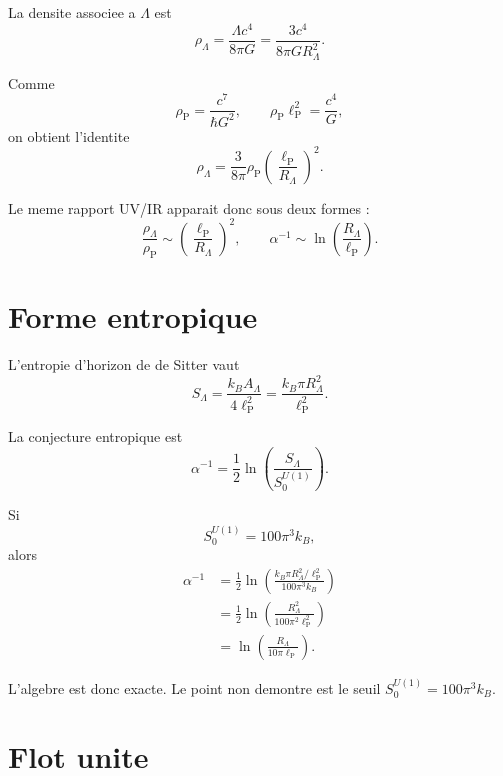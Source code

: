 \documentclass[11pt,a4paper]{article}
\newcommand{\lP}{\ell_{\mathrm P}}
\newcommand{\rhoP}{\rho_{\mathrm P}}
\newcommand{\RL}{R_{\Lambda}}
\newcommand{\SL}{S_{\Lambda}}
\newcommand{\Seuil}{S_0^{U(1)}}
\newcommand{\apinv}{\alpha^{-1}}
\begin{document}
La densite associee a \(\Lambda\) est
\begin{equation}
\rho_\Lambda=\frac{\Lambda c^4}{8\pi G}
=\frac{3c^4}{8\pi G\RL^2}.
\end{equation}

Comme
\begin{equation}
\rhoP=\frac{c^7}{\hbar G^2},
\qquad
\rhoP\lP^2=\frac{c^4}{G},
\end{equation}
on obtient l'identite
\begin{equation}
\boxed{\rho_\Lambda=\frac{3}{8\pi}\rhoP
\left(\frac{\lP}{\RL}\right)^2.}
\label{eq:rho_lambda_uv_ir}
\end{equation}

Le meme rapport UV/IR apparait donc sous deux formes :
\begin{equation}
\frac{\rho_\Lambda}{\rhoP}\sim \left(\frac{\lP}{\RL}\right)^2,
\qquad
\apinv\sim \ln\left(\frac{\RL}{\lP}\right).
\end{equation}

\section{Forme entropique}

L'entropie d'horizon de de Sitter vaut
\begin{equation}
\SL=\frac{k_B A_\Lambda}{4\lP^2}
=\frac{k_B\pi\RL^2}{\lP^2}.
\end{equation}

La conjecture entropique est
\begin{equation}
\boxed{\apinv=\frac12\ln\left(\frac{\SL}{\Seuil}\right).}
\label{eq:alpha_entropy}
\end{equation}

Si
\begin{equation}
\Seuil=100\pi^3 k_B,
\label{eq:S0_value}
\end{equation}
alors
\begin{align}
\apinv
&=\frac12\ln\left(
\frac{k_B\pi\RL^2/\lP^2}{100\pi^3 k_B}
\right)\\
&=\frac12\ln\left(\frac{\RL^2}{100\pi^2\lP^2}\right)\\
&=\ln\left(\frac{\RL}{10\pi\lP}\right).
\end{align}

L'algebre est donc exacte. Le point non demontre est le seuil
\(\Seuil=100\pi^3k_B\).

\section{Flot unite}
\end{document}
